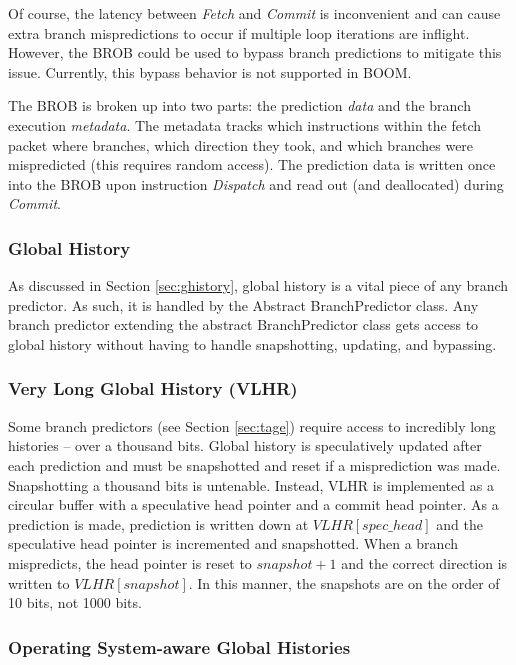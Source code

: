 Of course, the latency between {\em Fetch} and {\em Commit} is inconvenient and can cause extra branch mispredictions to occur if multiple loop iterations are inflight. However, the BROB could be used to bypass branch predictions to mitigate this issue. Currently, this bypass behavior is not supported in BOOM.

The BROB is broken up into two parts: the prediction {\em data} and the branch execution {\em metadata}.  The metadata tracks which instructions within the fetch packet where branches, which direction they took, and which branches were mispredicted (this requires random access). The prediction data is written once into the BROB upon instruction {\em Dispatch} and read out (and deallocated) during {\em Commit}.


\subsubsection{Global History}

As discussed in Section \ref{sec:ghistory}, global history is a vital piece of any branch predictor.  As such, it is handled by the Abstract BranchPredictor class.  Any branch predictor extending the abstract BranchPredictor class gets access to global history without having to handle  snapshotting, updating, and bypassing.

\subsubsection{Very Long Global History (VLHR)}\label{sec:vlhr}

Some branch predictors (see Section \ref{sec:tage}) require access to incredibly long histories -- over a thousand bits.  Global history is speculatively updated after each prediction and must be snapshotted and reset if a misprediction was made. Snapshotting a thousand bits is untenable.  Instead, VLHR is implemented as a circular buffer with a speculative head pointer and a commit head pointer.  As a prediction is made, prediction is written down at $VLHR[spec\_head]$ and the speculative head pointer is incremented and snapshotted. When a branch mispredicts, the head pointer is reset to $snapshot+1$ and the correct direction is written to $VLHR[snapshot]$.  In this manner, the snapshots are on the order of 10 bits, not 1000 bits.


\subsubsection{Operating System-aware Global Histories}

